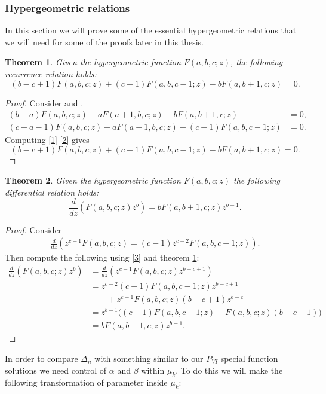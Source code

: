 \documentclass[12pt]{article}
\newtheorem{mydef}{Theorem}[section]
\numberwithin{figure}{section}
\numberwithin{equation}{section}
\numberwithin{table}{section}
\begin{document}
\subsubsection{Hypergeometric relations}
In this section we will prove some of the essential hypergeometric relations that we will need for some of the proofs later in this thesis.
\begin{mydef}\label{t1} Given the hypergeometric function $F(a,b,c;z)$, the following recurrence relation holds:
$$(b-c+1)F(a,b,c;z)+(c-1)F(a,b,c-1;z)-bF(a,b+1,c;z)=0.$$
\end{mydef}
\begin{proof}
Consider \cite[\S15.5.12]{DLMF} and \cite[\S15.5.15]{DLMF}.
\begin{subequations}
\begin{align}
(b-a)F(a,b,c;z)+aF(a+1,b,c;z)-bF(a,b+1,c;z)&=0, \label{1}\\
(c-a-1)F(a,b,c;z)+aF(a+1,b,c;z)-(c-1)F(a,b,c-1;z)&=0. \label{2}
\end{align}
\end{subequations}
Computing \eqref{1}-\eqref{2} gives
$$(b-c+1)F(a,b,c;z)+(c-1)F(a,b,c-1;z)-bF(a,b+1,c;z)=0.$$
\end{proof}
\begin{mydef}\label{t2} Given the hypergeometric function $F(a,b,c;z)$ the following  differential relation holds:
\begin{equation}
\frac{d}{dz}(F(a,b,c;z)z^b)=bF(a,b+1,c;z)z^{b-1}.
\end{equation}
\end{mydef}
\begin{proof}
Consider \cite[\S15.5.4]{DLMF}
\begin{align}
\frac{d}{dz}(z^{c-1}F(a,b,c;z)=(c-1)z^{c-2}F(a,b,c-1;z)). \label{3}
\end{align}
Then compute the following using \eqref{3} and theorem \ref{t1}:
\begin{align*}
\frac{d}{dz}(F(a,b,c;z)z^b)&=\frac{d}{dz}(z^{c-1}F(a,b,c;z)z^{b-c+1})\\
&=z^{c-2}(c-1)F(a,b,c-1;z)z^{b-c+1}\\&\qquad+z^{c-1}F(a,b,c;z)(b-c+1)z^{b-c}\\
&=z^{b-1}\big((c-1)F(a,b,c-1;z)+F(a,b,c;z)(b-c+1)\big)\\
&=bF(a,b+1,c;z)z^{b-1}.
\end{align*}
\end{proof}
In order to compare $\Delta_n$ with something similar to our $P_{VI}$ special function solutions we need control of $\alpha$ and $\beta$ within $\mu_k$. To do this we will make the following transformation of parameter inside $\mu_{k}$:
\end{document}
